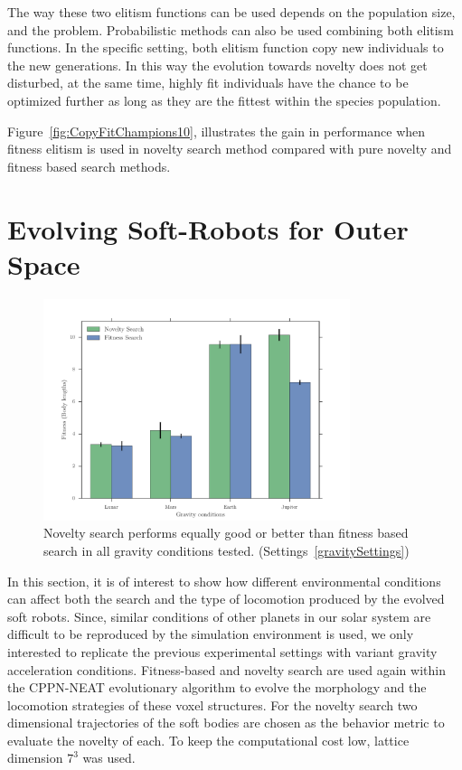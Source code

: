 The way these two elitism functions can be used depends on the population size, and the problem. Probabilistic methods can also be used combining both elitism functions. In the specific setting, both elitism function copy new individuals to the new generations. In this way the evolution towards novelty does not get disturbed, at the same time, highly fit individuals have the chance to be optimized further as long as they are the fittest within the species population.

Figure~\ref{fig:CopyFitChampions10}, illustrates the gain in performance when fitness elitism is used in novelty search method compared with pure novelty and fitness based search methods.
















\clearpage

\section{Evolving Soft-Robots for Outer Space}  

\begin{figure}[t!]
\centering
\includegraphics[width=0.8\textwidth]{../Figures/Results/GravityExperiment.pdf}
\caption{Novelty search performs equally good or better than fitness based search in all gravity conditions tested. (Settings~\ref{gravitySettings})}
\label{fig:gravityConditions}
\end{figure}

In this section, it is of interest to show how different environmental conditions can affect both the search and the type of locomotion produced by the evolved soft robots. Since, similar conditions of other planets in our solar system are difficult to be reproduced by the simulation environment is used, we only interested to replicate the previous experimental settings with variant gravity acceleration conditions. Fitness-based and novelty search are used again within the CPPN-NEAT evolutionary algorithm to evolve the morphology and the locomotion strategies of these voxel structures. For the novelty search two dimensional trajectories of the soft bodies are chosen as the behavior metric to evaluate the novelty of each. To keep the computational cost low, lattice dimension $7^3$ was used.

